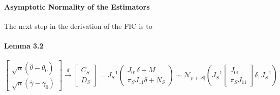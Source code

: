 \documentclass[12pt]{article}
\theoremstyle{definition}
\begin{document}
\paragraph{Asymptotic Normality of the Estimators}
The next step in the derivation of the FIC is to 
\paragraph{Lemma 3.2}
	$$
	\left[\begin{array}{c}
		\sqrt{n} (\hat{\theta} - \theta_0)\\
		\sqrt{n} (\hat{\gamma} - \gamma_0)
\end{array}\right]\overset{d}{\rightarrow} 
	\left[\begin{array}{c}
		C_S\\
		D_S
	\end{array}\right] = J_S^{-1}
	\left(\begin{array}{c}
		J_{01}\delta + M\\
		\pi_S J_{11}\delta + N_S 
	\end{array}\right) \sim \mathcal{N}_{p+|S|}
		\left(J_S^{-1}\left[\begin{array}{c}
			J_{01}\\
			\pi_S J_{11}
	\end{array}\right]\delta, J_S^{-1}\right)
$$
\end{document}
